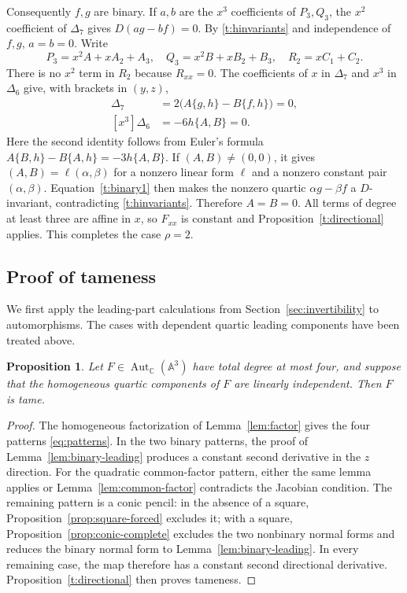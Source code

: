 \documentclass[11pt,reqno]{amsart}
\numberwithin{equation}{section}
\theoremstyle{plain}
\newtheorem{proposition}[theorem]{Proposition}
\theoremstyle{definition}
\theoremstyle{remark}
\newcommand{\C}{\mathbb C}
\newcommand{\A}{\mathbb A}
\newcommand{\Aut}{\operatorname{Aut}}
\newcommand{\br}[2]{\{#1,#2\}}
\begin{document}
Consequently $f,g$ are binary. If $a,b$ are the $x^3$ coefficients of
$P_3,Q_3$, the $x^2$ coefficient of $\Delta_7$ gives $D(ag-bf)=0$.
By \eqref{t:hinvariants} and independence of $f,g$, $a=b=0$. Write
\[
 P_3=x^2A+xA_2+A_3,\quad Q_3=x^2B+xB_2+B_3,
 \quad R_2=xC_1+C_2.
\]
There is no $x^2$ term in $R_2$ because $R_{xx}=0$.
The coefficients of $x$ in $\Delta_7$ and $x^3$ in $\Delta_6$ give,
with brackets in $(y,z)$,
\begin{align}
 [x]\Delta_7&=2\bigl(A\br gh-B\br fh\bigr)=0,\label{t:binary1}\\
 [x^3]\Delta_6&=-6h\br AB=0.\label{t:binary2}
\end{align}
Here the second identity follows from Euler's formula
$A\br Bh-B\br Ah=-3h\br AB$. If $(A,B)\ne(0,0)$, it gives
$(A,B)=\ell(\alpha,\beta)$ for a nonzero linear form $\ell$ and
a nonzero constant pair $(\alpha,\beta)$. Equation~\eqref{t:binary1} then
makes the nonzero quartic $\alpha g-\beta f$ a $D$-invariant,
contradicting \eqref{t:hinvariants}.
Therefore $A=B=0$. All terms of degree at least three are affine in $x$,
so $F_{xx}$ is constant and Proposition~\ref{t:directional} applies.
This completes the case $\rho=2$.

\subsection{Proof of tameness}\label{sec:tameness-assembly}
We first apply the leading-part calculations from
Section~\ref{sec:invertibility} to automorphisms. The cases with dependent
quartic leading components have been treated above.

\begin{proposition}\label{prop:tame-leading}
Let $F\in\Aut_{\C}(\A^3)$ have total degree at most four, and suppose
that the homogeneous quartic components of $F$ are linearly independent.
Then $F$ is tame.
\end{proposition}
\begin{proof}
The homogeneous factorization of Lemma~\ref{lem:factor} gives the four
patterns \eqref{eq:patterns}. In the two binary patterns, the proof of
Lemma~\ref{lem:binary-leading} produces a constant second derivative
in the $z$ direction. For the quadratic common-factor pattern, either the
same lemma applies or Lemma~\ref{lem:common-factor} contradicts the
Jacobian condition. The remaining pattern is a conic pencil: in the
absence of a square, Proposition~\ref{prop:square-forced} excludes it;
with a square, Proposition~\ref{prop:conic-complete} excludes the two
nonbinary normal forms and reduces the binary normal form to
Lemma~\ref{lem:binary-leading}. In every remaining case, the map therefore has a
constant second directional derivative. Proposition~\ref{t:directional}
then proves tameness.
\end{proof}
\end{document}
